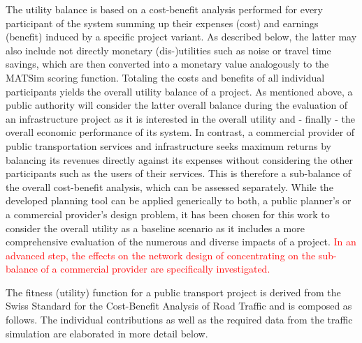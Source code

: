 The utility balance is based on a cost-benefit analysis performed for every participant of the system summing up their expenses (cost) and earnings (benefit) induced by a specific project variant. As described below, the latter may also include not directly monetary (dis-)utilities such as noise or travel time savings, which are then converted into a monetary value analogously to the MATSim scoring function. Totaling the costs and benefits of all individual participants yields the overall utility balance of a project. As mentioned above, a public authority will consider the latter overall balance during the evaluation of an infrastructure project as it is interested in the overall utility and - finally - the overall economic performance of its system. In contrast, a commercial provider of public transportation services and infrastructure seeks maximum returns by balancing its revenues directly against its expenses without considering the other participants such as the users of their services. This is therefore a sub-balance of the overall cost-benefit analysis, which can be assessed separately.
While the developed planning tool can be applied generically to both, a public planner's or a commercial provider's design problem, it has been chosen for this work to consider the overall utility as a baseline scenario as it includes a more comprehensive evaluation of the numerous and diverse impacts of a project. \textcolor{red}{In an advanced step, the effects on the network design of concentrating on the sub-balance of a commercial provider are specifically investigated.}

The fitness (utility) function for a public transport project is derived from the Swiss Standard for the Cost-Benefit Analysis of Road Traffic \citet{VSS_Norm_641820_2006Own} and is composed as follows. The individual contributions as well as the required data from the traffic simulation are elaborated in more detail below.

